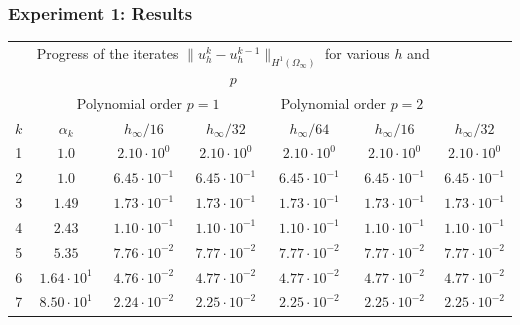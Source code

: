 \documentclass[aspectratio=169,xcolor=dvipsnames,11pt]{beamer}
\begin{document}
\begin{frame}\frametitle{Experiment 1: Results}

\begin{table}
\centering
\tiny
\renewcommand{\arraystretch}{1.3}
\begin{tabular}{ |c|c|c|c|c|c|c| }
 \hhline{|>{\arrayrulecolor{white}}-->{\arrayrulecolor{black}}|-----|}
 \multicolumn{2}{c|}{} & \multicolumn{5}{c|}{\cellcolor{lightgray!15} \small\raisebox{5pt}{\vphantom{f}} Progress of the iterates $\|u_h^{k} - u_h^{k-1}\|_{H^1(\Omega_\infty)}$ for various $h$ and $p$}\\[3pt]
 \hhline{|>{\arrayrulecolor{white}}-->{\arrayrulecolor{black}}|-----|}
 \multicolumn{2}{c|}{}& \multicolumn{3}{c|}{\cellcolor{lightgray!05} Polynomial order $p = 1$} & \multicolumn{2}{c|}{\cellcolor{lightgray!10} Polynomial order $p = 2$}\\
 \hline
 \rowcolor{lightgray!15}
 $k$ & $\alpha_{k}$ & $h_\infty/16$ & $h_\infty/32$ & $h_\infty/64$ & $h_\infty/16$ & $h_\infty/32$ \\
 \hline
\cellcolor{lightgray!05}   1 & \cellcolor{lightgray!01}   $1.0$              & $2.10\cdot 10^{0}$   & $2.10\cdot 10^{0}$   & $2.10\cdot 10^{0}$   & $2.10\cdot 10^{0}$   & $2.10\cdot 10^{0}$   \\
\cellcolor{lightgray!05}   2 & \cellcolor{lightgray!01}   $1.0$              & $6.45\cdot 10^{-1}$  & $6.45\cdot 10^{-1}$  & $6.45\cdot 10^{-1}$  & $6.45\cdot 10^{-1}$  & $6.45\cdot 10^{-1}$  \\
\cellcolor{lightgray!05}   3 & \cellcolor{lightgray!01}   $1.49$             & $1.73\cdot 10^{-1}$  & $1.73\cdot 10^{-1}$  & $1.73\cdot 10^{-1}$  & $1.73\cdot 10^{-1}$  & $1.73\cdot 10^{-1}$  \\
\cellcolor{lightgray!05}   4 & \cellcolor{lightgray!01}   $2.43$             & $1.10\cdot 10^{-1}$  & $1.10\cdot 10^{-1}$  & $1.10\cdot 10^{-1}$  & $1.10\cdot 10^{-1}$  & $1.10\cdot 10^{-1}$  \\
\cellcolor{lightgray!05}   5 & \cellcolor{lightgray!01}   $5.35$             & $7.76\cdot 10^{-2}$  & $7.77\cdot 10^{-2}$  & $7.77\cdot 10^{-2}$  & $7.77\cdot 10^{-2}$  & $7.77\cdot 10^{-2}$  \\
\cellcolor{lightgray!05}   6 & \cellcolor{lightgray!01}   $1.64\cdot 10^{1}$ & $4.76\cdot 10^{-2}$  & $4.77\cdot 10^{-2}$  & $4.77\cdot 10^{-2}$  & $4.77\cdot 10^{-2}$  & $4.77\cdot 10^{-2}$  \\
\cellcolor{lightgray!05}   7 & \cellcolor{lightgray!01}   $8.50\cdot 10^{1}$ & $2.24\cdot 10^{-2}$  & $2.25\cdot 10^{-2}$  & $2.25\cdot 10^{-2}$  & $2.25\cdot 10^{-2}$  & $2.25\cdot 10^{-2}$  \\

\end{tabular}
\end{table}
\end{frame}
\end{document}
